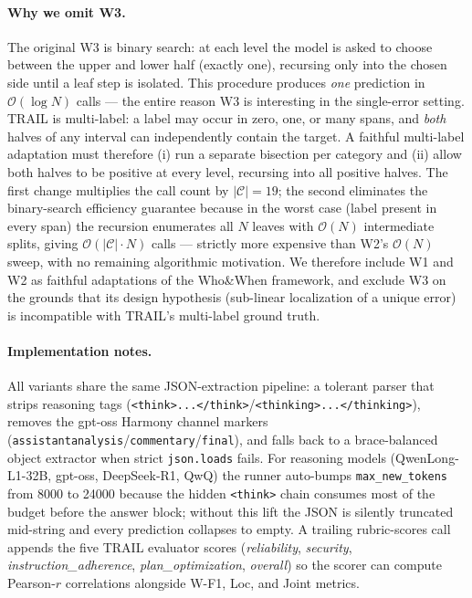 \paragraph{Why we omit W3.}
The original \textsc{W3} is binary search: at each level the model
is asked to choose between the upper and lower half (exactly one),
recursing only into the chosen side until a leaf step is isolated.
This procedure produces \emph{one} prediction in $\mathcal{O}(\log
N)$ calls --- the entire reason \textsc{W3} is interesting in the
single-error setting.
TRAIL is multi-label: a label may occur in zero, one, or many spans,
and \emph{both} halves of any interval can independently contain
the target. A faithful multi-label adaptation must therefore (i)
run a separate bisection per category and (ii) allow both halves
to be positive at every level, recursing into all positive halves.
The first change multiplies the call count by $|\mathcal{C}|=19$;
the second eliminates the binary-search efficiency guarantee
because in the worst case (label present in every span) the
recursion enumerates all $N$ leaves with $\mathcal{O}(N)$
intermediate splits, giving $\mathcal{O}(|\mathcal{C}| \cdot N)$
calls --- strictly more expensive than \textsc{W2}'s
$\mathcal{O}(N)$ sweep, with no remaining algorithmic motivation.
We therefore include \textsc{W1} and \textsc{W2} as faithful
adaptations of the Who\&When framework, and exclude \textsc{W3}
on the grounds that its design hypothesis (sub-linear localization
of a unique error) is incompatible with TRAIL's multi-label
ground truth.

\paragraph{Implementation notes.}
All variants share the same JSON-extraction pipeline: a tolerant
parser that strips reasoning tags
(\texttt{<think>...</think>}/\texttt{<thinking>...</thinking>}),
removes the gpt-oss Harmony channel markers
(\texttt{assistantanalysis}/\texttt{commentary}/\texttt{final}),
and falls back to a brace-balanced object extractor when strict
\texttt{json.loads} fails. For reasoning models
(QwenLong-L1-32B, gpt-oss, DeepSeek-R1, QwQ) the runner
auto-bumps \texttt{max\_new\_tokens} from 8000 to 24000 because
the hidden \texttt{<think>} chain consumes most of the budget
before the answer block; without this lift the JSON is silently
truncated mid-string and every prediction collapses to empty.
A trailing rubric-scores call appends the five TRAIL evaluator
scores (\textit{reliability}, \textit{security},
\textit{instruction\_adherence}, \textit{plan\_optimization},
\textit{overall}) so the scorer can compute Pearson-$r$
correlations alongside W-F1, Loc, and Joint metrics.

